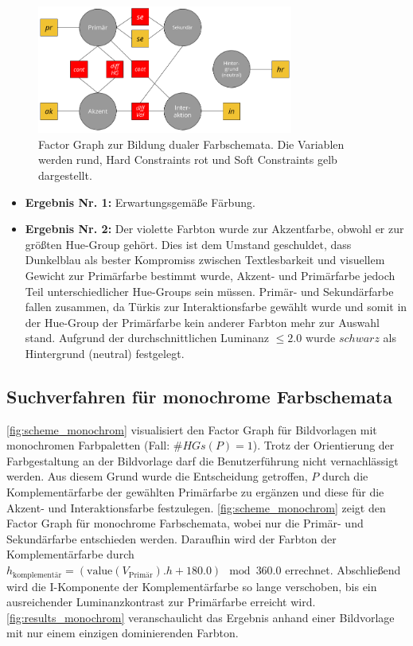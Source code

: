  \begin{figure}[h]
\centering
\includegraphics[width=0.75\textwidth]{img/scheme_dual.png}
\caption{Factor Graph zur Bildung dualer Farbschemata. Die Variablen werden rund, Hard Constraints rot und Soft Constraints gelb dargestellt.}
\label{fig:scheme_dual}
\end{figure}

 
 \begin{itemize}
	\item \textbf{Ergebnis Nr. 1:} Erwartungsgemäße Färbung.
	\item \textbf{Ergebnis Nr. 2:} Der violette Farbton wurde zur Akzentfarbe, obwohl er zur größten Hue-Group gehört. Dies ist dem Umstand geschuldet, dass Dunkelblau als bester Kompromiss zwischen Textlesbarkeit und visuellem Gewicht zur Primärfarbe bestimmt wurde, Akzent- und Primärfarbe jedoch Teil unterschiedlicher Hue-Groups sein müssen. Primär- und Sekundärfarbe fallen zusammen, da Türkis zur Interaktionsfarbe gewählt wurde und somit in der Hue-Group der Primärfarbe kein anderer Farbton mehr zur Auswahl stand. Aufgrund der durchschnittlichen Luminanz $\leq 2.0$ wurde $schwarz$ als Hintergrund (neutral) festgelegt.
\end{itemize}
 
\subsection{Suchverfahren für monochrome Farbschemata}
\label{sec:monochrome}

\autoref{fig:scheme_monochrom} visualisiert den Factor Graph für Bildvorlagen mit monochromen Farbpaletten (Fall: $\#HGs(P) = 1$). Trotz der Orientierung der Farbgestaltung an der Bildvorlage darf die Benutzerführung nicht vernachlässigt werden. Aus diesem Grund wurde die Entscheidung getroffen, $P$ durch die Komplementärfarbe der gewählten Primärfarbe zu ergänzen und diese für die Akzent- und Interaktionsfarbe festzulegen. \autoref{fig:scheme_monochrom} zeigt den Factor Graph für monochrome Farbschemata, wobei nur die Primär- und Sekundärfarbe entschieden werden. Daraufhin wird der Farbton der Komplementärfarbe durch $h_\text{komplementär} = (\text{value}(V_\text{Primär}).h + 180.0) \mod 360.0$ errechnet. Abschließend wird die I-Komponente der Komplementärfarbe so lange verschoben, bis ein ausreichender Luminanzkontrast zur Primärfarbe erreicht wird. \autoref{fig:results_monochrom} veranschaulicht das Ergebnis anhand einer Bildvorlage mit nur einem einzigen dominierenden Farbton.

